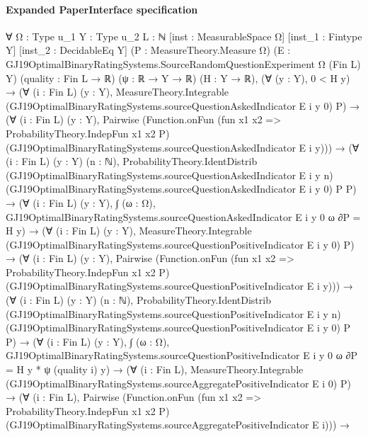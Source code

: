 \documentclass[10pt]{article}
\begin{document}
\paragraph{Expanded PaperInterface specification}
\begin{ReviewVerbatim}
∀ {Ω : Type u_1} {Y : Type u_2} {L : ℕ} [inst : MeasurableSpace Ω] [inst_1 : Fintype Y] [inst_2 : DecidableEq Y]
  (P : MeasureTheory.Measure Ω) (E : GJ19OptimalBinaryRatingSystems.SourceRandomQuestionExperiment Ω (Fin L) Y)
  (quality : Fin L → ℝ) (ψ : ℝ → Y → ℝ) (H : Y → ℝ),
  (∀ (y : Y), 0 < H y) →
    (∀ (i : Fin L) (y : Y),
        MeasureTheory.Integrable (GJ19OptimalBinaryRatingSystems.sourceQuestionAskedIndicator E i y 0) P) →
      (∀ (i : Fin L) (y : Y),
          Pairwise
            (Function.onFun (fun x1 x2 => ProbabilityTheory.IndepFun x1 x2 P)
              (GJ19OptimalBinaryRatingSystems.sourceQuestionAskedIndicator E i y))) →
        (∀ (i : Fin L) (y : Y) (n : ℕ),
            ProbabilityTheory.IdentDistrib (GJ19OptimalBinaryRatingSystems.sourceQuestionAskedIndicator E i y n)
              (GJ19OptimalBinaryRatingSystems.sourceQuestionAskedIndicator E i y 0) P P) →
          (∀ (i : Fin L) (y : Y),
              ∫ (ω : Ω), GJ19OptimalBinaryRatingSystems.sourceQuestionAskedIndicator E i y 0 ω ∂P = H y) →
            (∀ (i : Fin L) (y : Y),
                MeasureTheory.Integrable (GJ19OptimalBinaryRatingSystems.sourceQuestionPositiveIndicator E i y 0) P) →
              (∀ (i : Fin L) (y : Y),
                  Pairwise
                    (Function.onFun (fun x1 x2 => ProbabilityTheory.IndepFun x1 x2 P)
                      (GJ19OptimalBinaryRatingSystems.sourceQuestionPositiveIndicator E i y))) →
                (∀ (i : Fin L) (y : Y) (n : ℕ),
                    ProbabilityTheory.IdentDistrib
                      (GJ19OptimalBinaryRatingSystems.sourceQuestionPositiveIndicator E i y n)
                      (GJ19OptimalBinaryRatingSystems.sourceQuestionPositiveIndicator E i y 0) P P) →
                  (∀ (i : Fin L) (y : Y),
                      ∫ (ω : Ω), GJ19OptimalBinaryRatingSystems.sourceQuestionPositiveIndicator E i y 0 ω ∂P =
                        H y * ψ (quality i) y) →
                    (∀ (i : Fin L),
                        MeasureTheory.Integrable (GJ19OptimalBinaryRatingSystems.sourceAggregatePositiveIndicator E i 0)
                          P) →
                      (∀ (i : Fin L),
                          Pairwise
                            (Function.onFun (fun x1 x2 => ProbabilityTheory.IndepFun x1 x2 P)
                              (GJ19OptimalBinaryRatingSystems.sourceAggregatePositiveIndicator E i))) →

\end{ReviewVerbatim}
\end{document}
